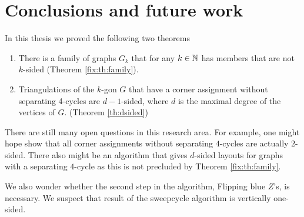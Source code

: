 
\section{ Conclusions and future work }

In this thesis we proved the following two theorems

\begin{enumerate}
  \item There is a family of graphs $G_k$ that for any $k \in \mathbb{N}$ has members that are not $k$-sided (Theorem \ref{fix:th:family}).
  \item Triangulations of the $k$-gon $G$ that have a corner assignment without separating 4-cycles are $d-1$-sided, where $d$ is the maximal degree of the vertices of $G$. (Theorem \ref{th:dsided})
\end{enumerate}

There are still many open questions in this research area. For example, one might hope show that all corner assignments without separating $4$-cycles are actually $2$-sided.
There also might be an algorithm that gives $d$-sided layouts for graphs with a separating $4$-cycle as this is not precluded by Theorem \ref{fix:th:family}.

We also wonder whether the second step in the algorithm, Flipping blue $Z$'s, is necessary.
We suspect that result of the sweepcycle algorithm is vertically one-sided.

